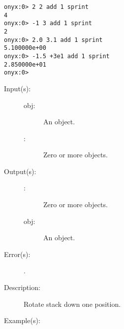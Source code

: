 \begin{description}
\begin{description}
\begin{verbatim}
onyx:0> 2 2 add 1 sprint
4
onyx:0> -1 3 add 1 sprint
2
onyx:0> 2.0 3.1 add 1 sprint
5.100000e+00
onyx:0> -1.5 +3e1 add 1 sprint
2.850000e+01
onyx:0>
		\end{verbatim}
	\end{description}
\label{systemdict:adn}
\item[{\onyxop{obj \commas}{adn}{\commas obj}}: ]
	\begin{description}\item[]
	\item[Input(s): ]
		\begin{description}\item[]
		\item[obj: ]
			An object.
		\item[\commas: ]
			Zero or more objects.
		\end{description}
	\item[Output(s): ]
		\begin{description}\item[]
		\item[\commas: ]
			Zero or more objects.
		\item[obj: ]
			An object.
		\end{description}
	\item[Error(s): ]
		\begin{description}\item[]
		\item[.]
		\end{description}
	\item[Description: ]
		Rotate stack down one position.
	\item[Example(s): ]\begin{verbatim}


\end{verbatim}
\end{description}
\end{description}
